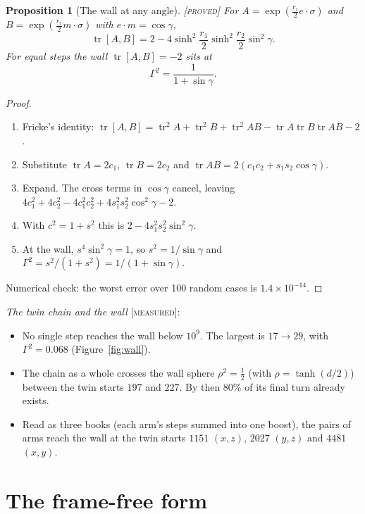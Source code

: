 \documentclass[11pt]{article}
\newtheorem{proposition}{Proposition}
\theoremstyle{definition}
\theoremstyle{remark}
\newcommand{\grade}[1]{\textsc{[#1]}}
\begin{document}
\begin{proposition}[The wall at any angle] \grade{proved}
For $A=\exp(\tfrac{r_1}{2}e\cdot\sigma)$ and $B=\exp(\tfrac{r_2}{2}m\cdot\sigma)$ with $e\cdot m=\cos\gamma$,
\[
\operatorname{tr}[A,B]=2-4\sinh^2\frac{r_1}{2}\sinh^2\frac{r_2}{2}\sin^2\gamma .
\]
For equal steps the wall $\operatorname{tr}[A,B]=-2$ sits at
\[
\Gamma^2=\frac{1}{1+\sin\gamma}.
\]
\end{proposition}
\begin{proof}
\begin{enumerate}
\item Fricke's identity: $\operatorname{tr}[A,B]=\operatorname{tr}^2A+\operatorname{tr}^2B+\operatorname{tr}^2AB-\operatorname{tr}A\operatorname{tr}B\operatorname{tr}AB-2$.
\item Substitute $\operatorname{tr}A=2c_1$, $\operatorname{tr}B=2c_2$ and $\operatorname{tr}AB=2(c_1c_2+s_1s_2\cos\gamma)$.
\item Expand. The cross terms in $\cos\gamma$ cancel, leaving $4c_1^2+4c_2^2-4c_1^2c_2^2+4s_1^2s_2^2\cos^2\gamma-2$.
\item With $c^2=1+s^2$ this is $2-4s_1^2s_2^2\sin^2\gamma$.
\item At the wall, $s^4\sin^2\gamma=1$, so $s^2=1/\sin\gamma$ and $\Gamma^2=s^2/(1+s^2)=1/(1+\sin\gamma)$.
\end{enumerate}
Numerical check: the worst error over 100 random cases is $1.4\times10^{-14}$.
\end{proof}

\noindent\emph{The twin chain and the wall} \grade{measured}:
\begin{itemize}
\item No single step reaches the wall below $10^9$. The largest is $17\to29$, with $\Gamma^2=0.068$ (Figure~\ref{fig:wall}).
\item The chain as a whole crosses the wall sphere $\rho^2=\tfrac12$ (with $\rho=\tanh(d/2)$) between the twin starts $197$ and $227$. By then $80\%$ of its final turn already exists.
\item Read as three books (each arm's steps summed into one boost), the pairs of arms reach the wall at the twin starts $1151$ $(x,z)$, $2027$ $(y,z)$ and $4481$ $(x,y)$.
\end{itemize}

\section{The frame-free form}
\end{document}
